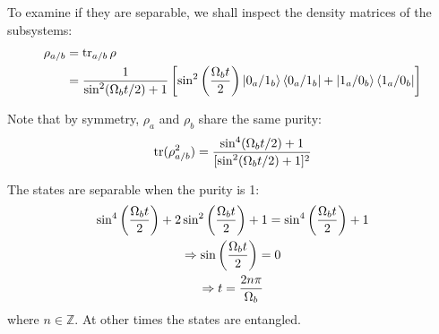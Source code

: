 \begin{parts}
	To examine if they are separable, we shall inspect the density matrices of the subsystems:
	\begin{align*}
		\rho_{a/b} &= \textnormal{tr}_{a/b}\,\rho \\
		&= \frac{1}{\sin^2(\Omega_b t/2) + 1} \left[\sin^2\left(\frac{\Omega_b t}{2}\right) \ket{0_a/1_b} \bra{0_a/1_b} + \ket{1_a/0_b} \bra{1_a/0_b}\right]
	\end{align*}
	
	Note that by symmetry, $\rho_a$ and $\rho_b$ share the same purity:
	\begin{equation*}
		\textnormal{tr}(\rho_{a/b}^2) = \frac{\sin^4 (\Omega_b t/2) + 1}{[\sin^2(\Omega_b t/2) + 1]^2}
	\end{equation*}
	
	The states are separable when the purity is 1:
	\begin{gather*}
		\sin^4 \left(\frac{\Omega_b t}{2}\right) + 2\sin^2 \left(\frac{\Omega_b t}{2}\right) + 1 = \sin^4 \left(\frac{\Omega_b t}{2}\right) + 1 \\
		\Rightarrow \sin\left(\frac{\Omega_b t}{2}\right) = 0 \\
		\Rightarrow t = \frac{2n\pi}{\Omega_b}
	\end{gather*}
	where $n\in\mathbb{Z}$. At other times the states are entangled.
\end{parts}